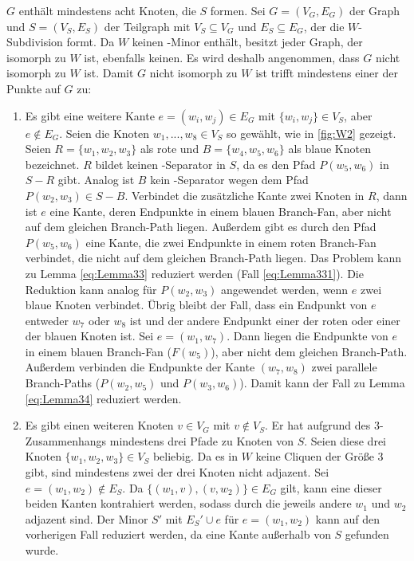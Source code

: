 \begin{beweis}
  $G$ enthält mindestens acht Knoten, die $S$ formen.
  Sei $G = (V_G, E_G)$ der Graph und $S = (V_S, E_S)$ der Teilgraph mit $V_S \subseteq V_G$ und $E_S \subseteq E_G$, der die $W$-Subdivision formt.
  Da $W$ keinen \kf-Minor enthält, besitzt jeder Graph, der isomorph zu $W$ ist, ebenfalls keinen.
  Es wird deshalb angenommen, dass $G$ nicht isomorph zu $W$ ist.
  Damit $G$ nicht isomorph zu $W$ ist trifft mindestens einer der Punkte auf $G$ zu:
  \begin{enumerate}
    \item Es gibt eine weitere Kante $e = (w_i, w_j) \in E_G$ mit $\{w_i, w_j\} \in V_S$, aber $e \notin E_G$.
    Seien die Knoten $w_1, ..., w_8 \in V_S$ \oBdA so gewählt, wie in \Abb \ref{fig:W2} gezeigt.
    Seien $R = \{w_1, w_2, w_3\}$ als rote und $B = \{w_4, w_5, w_6\}$ als blaue Knoten bezeichnet.
    $R$ bildet keinen \dd-Separator in $S$, da es den Pfad $P(w_5, w_6)$ in $S - R$ gibt.
    Analog ist $B$ kein \dd-Separator wegen dem Pfad $P(w_2, w_3) \in S - B$.
    Verbindet die zusätzliche Kante zwei Knoten in $R$, dann ist $e$ eine Kante, deren Endpunkte in einem blauen Branch-Fan, aber nicht auf dem gleichen Branch-Path liegen.
    Außerdem gibt es durch den Pfad $P(w_5, w_6)$ eine Kante, die zwei Endpunkte in einem roten Branch-Fan verbindet, die nicht auf dem gleichen Branch-Path liegen.
    Das Problem kann zu Lemma \ref{eq:Lemma33} reduziert werden (Fall \ref{eq:Lemma331}).
    Die Reduktion kann analog für $P(w_2, w_3)$ angewendet werden, wenn $e$ zwei blaue Knoten verbindet.
    Übrig bleibt der Fall, dass ein Endpunkt von $e$ entweder $w_7$ oder $w_8$ ist und der andere Endpunkt einer der roten oder einer der blauen Knoten ist.
    Sei \oBdA $e = (w_1, w_7)$.
    Dann liegen die Endpunkte von $e$ in einem blauen Branch-Fan ($F(w_5)$), aber nicht dem gleichen Branch-Path.
    Außerdem verbinden die Endpunkte der Kante $(w_7, w_8)$ zwei parallele Branch-Paths ($P(w_2, w_5)$ und $P(w_3, w_6)$).
    Damit kann der Fall zu Lemma \ref{eq:Lemma34} reduziert werden.
    \item Es gibt einen weiteren Knoten $v \in V_G$ mit $v \notin V_S$.
    Er hat aufgrund des $3$-Zusammenhangs mindestens drei Pfade zu Knoten von $S$.
    Seien diese drei Knoten $\{w_1, w_2, w_3\} \in V_S$ beliebig.
    Da es in $W$ keine Cliquen der Größe $3$ gibt, sind mindestens zwei der drei Knoten nicht adjazent.
    Sei \oBdA $e = (w_1, w_2) \notin E_S$.
    Da $\{(w_1, v), (v, w_2)\} \in E_G$ gilt, kann eine dieser beiden Kanten kontrahiert werden, sodass durch die jeweils andere $w_1$ und $w_2$ adjazent sind.
    Der Minor $S'$ mit $E_S' \cup e$ für $e = (w_1, w_2)$ kann auf den vorherigen Fall reduziert werden, da eine Kante außerhalb von $S$ gefunden wurde.
  \end{enumerate}
\end{beweis}

